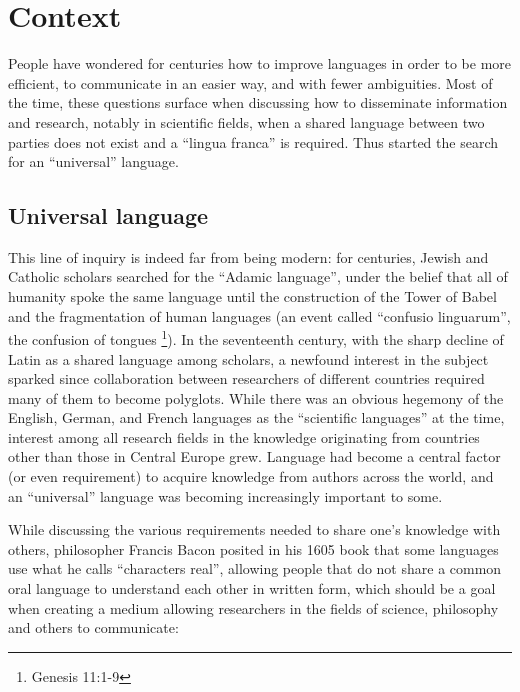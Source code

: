 \chapter{Context}

\vspace{0.5cm}

People have wondered for centuries how to improve languages in order to be more efficient, to communicate in an easier way, and with fewer ambiguities.
Most of the time, these questions surface when discussing how to disseminate information and research, notably in scientific fields, when a shared language
between two parties does not exist and a ``lingua franca'' is required. Thus started the search for an ``universal'' language.

\section{Universal language}

This line of inquiry is indeed far from being modern: for centuries, Jewish and Catholic scholars searched for the ``Adamic language'', under the belief that
all of humanity spoke the same language until the construction of the Tower of Babel and the fragmentation of human languages (an event called ``confusio linguarum'',
the confusion of tongues \footnote{Genesis 11:1-9}). In the seventeenth century, with the sharp decline of Latin as a shared language among scholars, a newfound interest in
the subject sparked since collaboration between researchers of different countries required many of them to become polyglots. While there was an obvious hegemony of the English,
German, and French languages as the ``scientific languages'' at the time, interest among all research fields in the knowledge originating from countries other than those in Central Europe grew.
Language had become a central factor (or even requirement) to acquire knowledge from authors across the world, and an ``universal'' language was becoming increasingly important to some.\newline

While discussing the various requirements needed to share one's knowledge with others, philosopher Francis Bacon posited in his 1605 book that some languages use what
he calls ``characters real'', allowing people that do not share a common oral language to understand each other in written form, which should be a goal when creating a
medium allowing researchers in the fields of science, philosophy and others to communicate:

